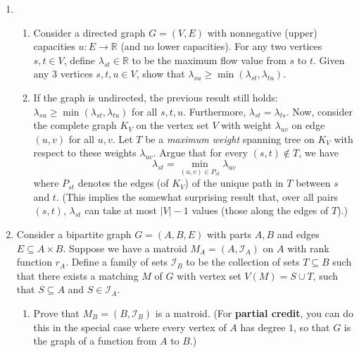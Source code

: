 \documentclass[12pt]{article}
\begin{document}
\begin{enumerate}
\bigskip

\item


\begin{enumerate}
	\item
Consider a directed graph $G=(V,E)$ with nonnegative (upper) capacities $u: E \rightarrow {\mathbb R}$ (and no lower capacities). For any two vertices $s, t\in V$, define $\lambda_{st}\in {\mathbb R}$ to be the maximum flow value from $s$ to $t$. Given any 3 vertices $s, t, u\in V$, show that $\lambda_{su} \geq \min(\lambda_{st},\lambda_{tu})$. 

\item If the graph is undirected, the previous result still holds: $\lambda_{su} \geq \min(\lambda_{st},\lambda_{tu})$ for all $s, t, u$. Furthermore, $\lambda_{st}=\lambda_{ts}$. Now, consider the complete graph $K_V$ on the vertex set $V$ with weight $\lambda_{uv}$ on edge $(u,v)$ for all $u,v$. Let $T$ be a {\it maximum weight} spanning tree on $K_V$ with respect to these weights $\lambda_{uv}$. Argue that for every $(s,t)\notin T$, we have
\[
\lambda_{st}=\min_{(u,v)\in P_{st}} \lambda_{uv}
\]
where $P_{st}$ denotes the edges (of $K_V$) of the unique path in $T$ between $s$ and $t$. (This implies the somewhat surprising result that, over all pairs $(s,t)$, $\lambda_{st}$ can take at most $|V|-1$ values (those along the edges of $T$).)
\end{enumerate}


\bigskip

\item 


Consider a bipartite graph $G = (A,B,E)$ with parts $A,B$ and edges $E \subseteq A\times B$. Suppose we have a matroid $M_A = (A,\mathcal{I}_A)$ on $A$ with rank function $r_A$. Define a family of sets $\mathcal{I}_B$ to be the collection of sets $T \subseteq B$ such that there exists a matching $M$ of $G$ with vertex set $V(M) = S\cup T$, such that $S \subseteq A$ and $S \in \mathcal{I}_A$.

\begin{enumerate}
\item Prove that $M_B = (B,\mathcal{I}_B)$ is a matroid. (For {\bf partial credit}, you can do this in the special case where every vertex of $A$ has degree $1$, so that $G$ is the graph of a function from $A$ to $B$.)


\end{enumerate}
\end{enumerate}
\end{document}
